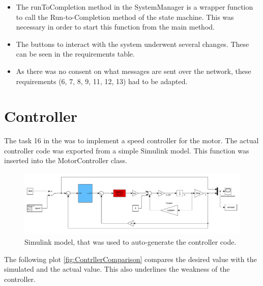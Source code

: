 \documentclass[a4paper,12pt,twoside]{scrreprt}
\begin{document}
\begin{itemize}
	\item The runToCompletion method in the SystemManager is a wrapper function to call the Run-to-Completion method of the state machine. This was necessary in order to start this function from the main method. 
	\item The buttons to interact with the system underwent several changes. These can be seen in the requirements table.
	\item As there was no consent on what messages are sent over the network, these requirements (6, 7, 8, 9, 11, 12, 13) had to be adapted. 
\end{itemize}


\chapter{Controller}
The task 16 in the  was to implement a speed controller for the motor. The actual controller code was exported from a simple Simulink model. This function was inserted into the MotorController class.

\begin{figure}[H]
	\centering
	\includegraphics[width=\textwidth,height=\textheight,keepaspectratio]{../Controller/simulinkModel.pdf}
	\caption[Simulink Model]{Simulink model, that was used to auto-generate the controller code. }
	\label{fig:SimulinkModel}
\end{figure}

\newpage

The following plot \ref{fig:ContrllerComparison} compares the desired value with the simulated and the actual value. This also underlines the weakness of the controller. 
\end{document}
